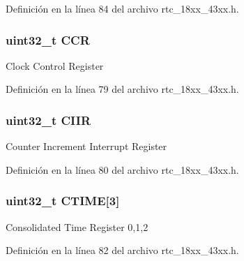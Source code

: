 Definición en la línea 84 del archivo rtc\+\_\+18xx\+\_\+43xx.\+h.

\subsubsection[{\texorpdfstring{C\+CR}{CCR}}]{ uint32\+\_\+t C\+CR}\hypertarget{struct_l_p_c___r_t_c___t_a5e1322e27c40bf91d172f9673f205c97}{}\label{struct_l_p_c___r_t_c___t_a5e1322e27c40bf91d172f9673f205c97}
Clock Control Register 

Definición en la línea 79 del archivo rtc\+\_\+18xx\+\_\+43xx.\+h.

\subsubsection[{\texorpdfstring{C\+I\+IR}{CIIR}}]{ uint32\+\_\+t C\+I\+IR}\hypertarget{struct_l_p_c___r_t_c___t_a5c2a7b9f2be3f9120dbf2c71024d1209}{}\label{struct_l_p_c___r_t_c___t_a5c2a7b9f2be3f9120dbf2c71024d1209}
Counter Increment Interrupt Register 

Definición en la línea 80 del archivo rtc\+\_\+18xx\+\_\+43xx.\+h.

\subsubsection[{\texorpdfstring{C\+T\+I\+ME}{CTIME}}]{ uint32\+\_\+t C\+T\+I\+ME\mbox{[}3\mbox{]}}\hypertarget{struct_l_p_c___r_t_c___t_ad135ab5f27a442004aa76b6912c49bb1}{}\label{struct_l_p_c___r_t_c___t_ad135ab5f27a442004aa76b6912c49bb1}
Consolidated Time Register 0,1,2 

Definición en la línea 82 del archivo rtc\+\_\+18xx\+\_\+43xx.\+h.


